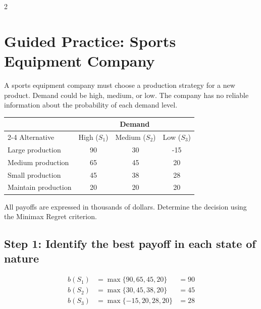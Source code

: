 	\begin{multicols}{2}

		\section{Guided Practice: Sports Equipment Company}
		
		A sports equipment company must choose a production strategy for a new
		product. Demand could be high, medium, or low. The company has no reliable
		information about the probability of each demand level.
		
		\begin{center}
			\renewcommand{\arraystretch}{1.3}
			\small
			\begin{tabular}{lccc}
				\toprule
				& \multicolumn{3}{c}{Demand} \\
				\cmidrule(lr){2-4}
				Alternative & High ($S_1$) & Medium ($S_2$) & Low ($S_3$) \\
				\midrule
				Large production  & 90 & 30 & -15 \\
				Medium production & 65 & 45 & 20 \\
				Small production  & 45 & 38 & 28 \\
				Maintain production & 20 & 20 & 20 \\
				\bottomrule
			\end{tabular}
		\end{center}
		
		All payoffs are expressed in thousands of dollars. Determine the decision using the Minimax Regret criterion.
		
		\subsection*{Step 1: Identify the best payoff in each state of nature}
		\[
		\begin{array}{lll}
			b(S_1) &= \max\{90,65,45,20\} &= 90 \\[3pt]
			b(S_2) &= \max\{30,45,38,20\} &= 45 \\[3pt]
			b(S_3) &= \max\{-15,20,28,20\} &= 28
		\end{array}
		\]
		

\end{multicols}
